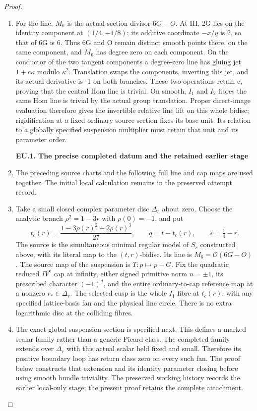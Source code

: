 \begin{proof}
\begin{enumerate}[label=\arabic*.]
\item For the line, \(M_6\) is the actual section divisor \(6G-O\). At III, 2G
lies on the identity component at \((1/4,-1/8)\); its additive coordinate
\(-x/y\) is 2, so that of 6G is 6. Thus 6G and O remain
distinct smooth points there, on the same component, and \(M_6\) has
degree zero on each component. On the conductor of the two tangent
components a degree-zero line has gluing jet \(1+c\kappa\) modulo
\(\kappa^2\). Translation swaps the components, inverting this jet, and its actual derivative is -1 on both branches. These two
operations retain c, proving that the central Hom line is trivial.
On smooth, \(I_1\) and \(I_2\) fibres the same Hom line is trivial by the
actual group translation. Proper direct-image evaluation therefore
gives the invertible relative line lift on this whole bidisc;
rigidification at a fixed ordinary source section fixes its base
unit. Its relation to a globally specified suspension multiplier
must retain that unit and its parameter order.

\par

\medskip\noindent\textbf{EU.1. The precise completed datum and the retained earlier stage}

\par\nobreak

\item The preceding source charts and the following full line and cap maps are used together. The initial local calculation remains in the preserved attempt record.

\item Take a small closed complex parameter disc \(\Delta_r\) about zero.
Choose the analytic branch \(\rho^2=1-3r\) with \(\rho(0)=-1\), and put
\[
 t_c(r)=\frac{1-3\rho(r)^2+2\rho(r)^3}{27},\qquad
 q=t-t_c(r),\qquad s=\tfrac14-r.
 \tag{EU.1}
\]
The source is the simultaneous minimal regular model of \(S_r\)
constructed above, with its literal map to the \((t,r)\)-bidisc. Its
line is \(M_6=\mathcal O(6G-O)\). The source map of the suspension is
\(T:p\mapsto p-G\). Fix the quadratic reduced \(IV^*\) cap at infinity,
either signed primitive norm \(n=\pm1\), its prescribed character
\((-1)^d\), and the entire ordinary-to-cap reference map at a nonzero
\(r_*\in\Delta_r\). The selected cusp is the whole \(I_1\) fibre at
\(t_c(r)\), with any specified lattice-basis fan and the physical line
circle. There is no extra logarithmic disc at the colliding fibres.

\item The exact global suspension section is specified next. This defines a
marked scalar family rather than a generic Picard class. The completed
family extends over \(\Delta_r\) with this actual scalar held fixed and
small. Therefore its positive boundary loop has return class zero on
every such fan. The proof below constructs that extension and its
identity parameter closing before using smooth bundle triviality.
The preserved working history records the earlier local-only stage; the present proof retains the complete attachment.


\end{enumerate}
\end{proof}
